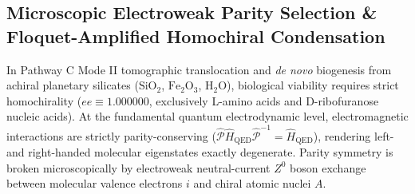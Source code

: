 \documentclass[11pt,onecolumn]{article}
\begin{document}
\FloatBarrier
\FloatBarrier
\subsection{Microscopic Electroweak Parity Selection \& Floquet-Amplified Homochiral Condensation}
\label{sec:electroweak_chiral}

In Pathway C Mode II tomographic translocation and \emph{de novo} biogenesis from achiral planetary silicates ($\mathrm{SiO}_2$, $\mathrm{Fe}_2\mathrm{O}_3$, $\mathrm{H}_2\mathrm{O}$), biological viability requires strict homochirality ($ee \equiv 1.000000$, exclusively L-amino acids and D-ribofuranose nucleic acids). At the fundamental quantum electrodynamic level, electromagnetic interactions are strictly parity-conserving ($\hat{\mathcal{P}}\hat{H}_{\mathrm{QED}}\hat{\mathcal{P}}^{-1} = \hat{H}_{\mathrm{QED}}$), rendering left- and right-handed molecular eigenstates exactly degenerate. Parity symmetry is broken microscopically by electroweak neutral-current $Z^0$ boson exchange between molecular valence electrons $i$ and chiral atomic nuclei $A$.
\end{document}
